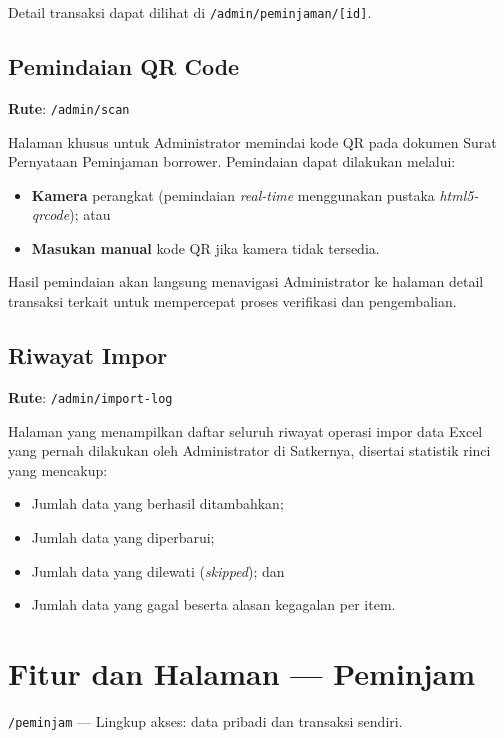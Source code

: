 \documentclass[
  12pt,
  a4paper,
  oneside,
  final
]{report}
\begin{document}
Detail transaksi dapat dilihat di
\texttt{/admin/peminjaman/[id]}.

\section{Pemindaian QR Code}
\textbf{Rute}: \texttt{/admin/scan}

Halaman khusus untuk Administrator memindai kode QR pada dokumen
Surat Pernyataan Peminjaman borrower. Pemindaian dapat dilakukan
melalui:
\begin{itemize}
  \item {\bfseries Kamera} perangkat (pemindaian {\it real-time}
        menggunakan pustaka {\it html5-qrcode}); atau
  \item {\bfseries Masukan manual} kode QR jika kamera tidak tersedia.
\end{itemize}

Hasil pemindaian akan langsung menavigasi Administrator ke halaman
detail transaksi terkait untuk mempercepat proses verifikasi dan
pengembalian.

\section{Riwayat Impor}
\textbf{Rute}: \texttt{/admin/import-log}

Halaman yang menampilkan daftar seluruh riwayat operasi impor data
Excel yang pernah dilakukan oleh Administrator di Satkernya,
disertai statistik rinci yang mencakup:
\begin{itemize}
  \item Jumlah data yang berhasil ditambahkan;
  \item Jumlah data yang diperbarui;
  \item Jumlah data yang dilewati ({\it skipped}); dan
  \item Jumlah data yang gagal beserta alasan kegagalan per item.
\end{itemize}

\chapter{Fitur dan Halaman --- Peminjam}

\verb|/peminjam| --- Lingkup akses: data pribadi dan transaksi sendiri.
\end{document}
